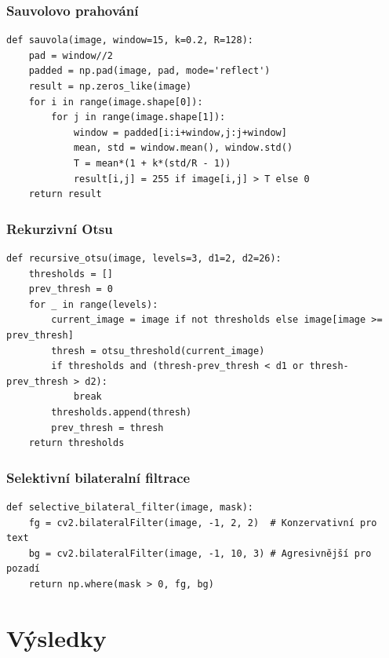 \documentclass[12pt,a4paper]{article}
\begin{document}
\subsubsection{Sauvolovo prahování}
\begin{verbatim}
def sauvola(image, window=15, k=0.2, R=128):
    pad = window//2
    padded = np.pad(image, pad, mode='reflect')
    result = np.zeros_like(image)
    for i in range(image.shape[0]):
        for j in range(image.shape[1]):
            window = padded[i:i+window,j:j+window]
            mean, std = window.mean(), window.std()
            T = mean*(1 + k*(std/R - 1))
            result[i,j] = 255 if image[i,j] > T else 0
    return result
\end{verbatim}

\subsubsection{Rekurzivní Otsu}
\begin{verbatim}
def recursive_otsu(image, levels=3, d1=2, d2=26):
    thresholds = []
    prev_thresh = 0
    for _ in range(levels):
        current_image = image if not thresholds else image[image >= prev_thresh]
        thresh = otsu_threshold(current_image)
        if thresholds and (thresh-prev_thresh < d1 or thresh-prev_thresh > d2):
            break
        thresholds.append(thresh)
        prev_thresh = thresh
    return thresholds
\end{verbatim}

\subsubsection{Selektivní bilateralní filtrace}
\begin{verbatim}
def selective_bilateral_filter(image, mask):
    fg = cv2.bilateralFilter(image, -1, 2, 2)  # Konzervativní pro text
    bg = cv2.bilateralFilter(image, -1, 10, 3) # Agresivnější pro pozadí
    return np.where(mask > 0, fg, bg)
\end{verbatim}

\section{Výsledky}
\end{document}

